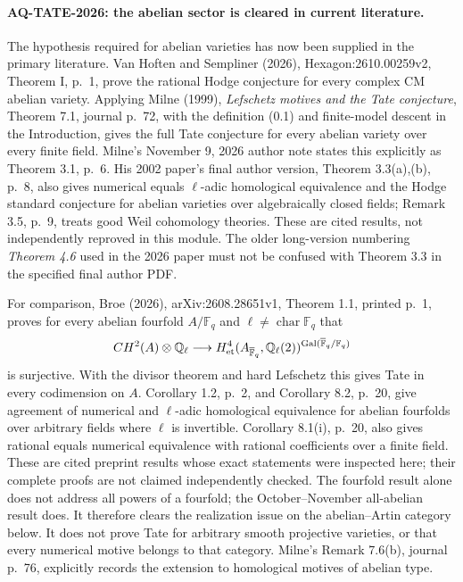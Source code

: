 \documentclass[11pt,a4paper]{article}
\theoremstyle{definition}\newtheorem{definition}[theorem]{Definition}
\theoremstyle{remark}\newtheorem{remark}[theorem]{Remark}
\begin{document}
\paragraph{AQ-TATE-2026: the abelian sector is cleared in current literature.}
The hypothesis required for abelian varieties has now
been supplied in the primary literature. Van Hoften
and Sempliner (2026), Hexagon:2610.00259v2,
Theorem I, p.~1, prove the rational Hodge conjecture
for every complex CM abelian variety. Applying
Milne (1999), \emph{Lefschetz motives and the Tate
conjecture}, Theorem 7.1, journal p.~72, with the definition (0.1)
and finite-model descent in the Introduction, gives
the full Tate conjecture for every abelian variety
over every finite field. Milne's November 9, 2026
author note states this explicitly as Theorem 3.1,
p.~6. His 2002 paper's final author version,
Theorem 3.3(a),(b), p.~8, also gives numerical
equals $\ell$-adic homological equivalence and the
Hodge standard conjecture for abelian varieties
over algebraically closed fields; Remark 3.5,
p.~9, treats good Weil cohomology theories.
These are cited results, not independently reproved
in this module. The older long-version numbering
\emph{Theorem 4.6} used in the 2026 paper must not
be confused with Theorem 3.3 in the specified final
author PDF.

For comparison, Broe (2026), arXiv:2608.28651v1, Theorem 1.1,
printed p.~1, proves for every abelian fourfold
$A/\mathbb F_q$ and $\ell\ne\operatorname{char}\mathbb F_q$ that
\[
 CH^2(A)\otimes\mathbb Q_\ell\longrightarrow
 H^4_{\rm et}(A_{\overline{\mathbb F}_q},\mathbb Q_\ell(2))
 ^{\operatorname{Gal}(\overline{\mathbb F}_q/\mathbb F_q)}
\]
is surjective. With the divisor theorem and hard
Lefschetz this gives Tate in every codimension on $A$.
Corollary 1.2, p.~2, and Corollary 8.2, p.~20,
give agreement of numerical and $\ell$-adic homological
equivalence for abelian fourfolds over arbitrary fields
where $\ell$ is invertible. Corollary 8.1(i), p.~20,
also gives rational equals numerical equivalence with
rational coefficients over a finite field.
These are cited preprint results whose exact statements
were inspected here; their complete proofs are not
claimed independently checked. The fourfold result
alone does not address all powers of a fourfold;
the October--November all-abelian result does.
It therefore clears the realization issue on the
abelian--Artin category below. It does not prove
Tate for arbitrary smooth projective varieties,
or that every numerical motive belongs to that category.
Milne's Remark 7.6(b), journal p.~76, explicitly
records the extension to homological motives of
abelian type.
\end{document}

